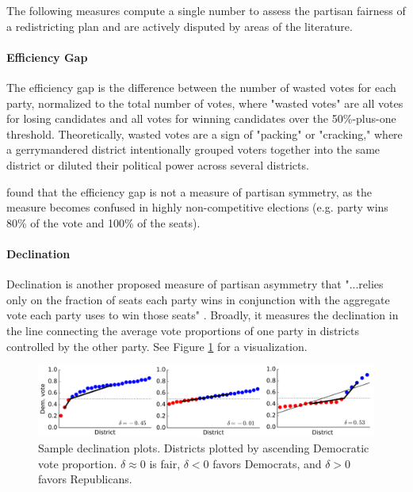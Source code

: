 The following measures compute a single number to assess the partisan fairness of a redistricting plan and are actively disputed by areas of the literature.

\paragraph{Efficiency Gap}
\label{sec:effgap}

The efficiency gap is the difference between the number of wasted votes for each party, normalized to the total number of votes, where "wasted votes" are all votes for losing candidates and all votes for winning candidates over the 50\%-plus-one threshold. Theoretically, wasted votes are a sign of "packing" or "cracking," where a gerrymandered district intentionally grouped voters together into the same district or diluted their political power across several districts. \parencite{stephanopoulos2014}

\textcite{veomett2018} found that the efficiency gap is not a measure of partisan symmetry, as the measure becomes confused in highly non-competitive elections (e.g. party wins 80\% of the vote and 100\% of the seats). 

\paragraph{Declination}
\label{sec:declination}

Declination is another proposed measure of partisan asymmetry that "...relies only on the fraction of seats each party wins in conjunction with the aggregate vote each party uses to win those seats" \parencite[3]{warrington2018}. Broadly, it measures the declination in the line connecting the average vote proportions of one party in districts controlled by the other party. See Figure \ref{fig:dec} for a visualization. 

\begin{figure}
    \centering
    \includegraphics[width=\textwidth]{img/dec.PNG}
    \caption{Sample declination plots. Districts plotted by ascending Democratic vote proportion. $\delta \approx 0$ is fair, $\delta < 0$ favors Democrats, and $\delta > 0$ favors Republicans. \parencite[6]{warrington2018}}
    \label{fig:dec}
\end{figure}

